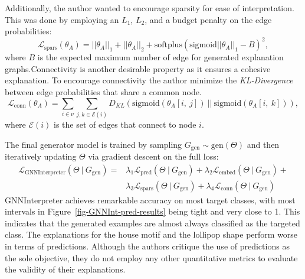 \documentclass[
  11pt,
  letterpaper,
]{article}
\begin{document}
Additionally, the author wanted to encourage sparsity for ease of
interpretation. This was done by employing an \(L_1\), \(L_2\), and a
budget penalty on the edge probabilities:\\
\begin{equation}
        \mathcal{L}_{\text{spars}}(\theta_A) = ||\theta_A||_1 + ||\theta_A||_2 + \text{softplus}(\text{sigmoid}||\theta_A||_1 - B)^2, 
    \end{equation} where \(B\) is the expected maximum number of edge
for generated explanation graphs.Connectivity is another desirable
property as it ensures a cohesive explanation. To encourage connectivity
the author minimize the \emph{KL-Divergence} between edge probabilities
that share a common node. \begin{equation}
        \mathcal{L}_{\text{conn}}(\theta_A) = \sum_{i \in \nu} \sum_{j, k \in \mathcal{E}(i)} D_{KL}(\text{sigmoid}(\theta_A[i, \ j]) \ || \ \text{sigmoid}(\theta_A[i, \ k])), 
    \end{equation} where \(\mathcal{E}(i)\) is the set of edges that
connect to node \(i\).

\quad The final generator model is trained by sampling
\(G_\text{gen} \sim \text{gen}(\Theta)\) and then iteratively updating
\(\Theta\) via gradient descent on the full loss: \begin{equation}
        \begin{split}
            \mathcal{L}_{\text{GNNInterpreter}}(\Theta \ | \ G_\text{gen}) = 
            &\lambda_1 \mathcal{L}_{\text{pred}}(\Theta \ | \ G_\text{gen}) + 
            \lambda_2 \mathcal{L}_{\text{embed}}(\Theta \ | \ G_\text{gen}) +  \\
            &\lambda_3 \mathcal{L}_{\text{spars}}(\Theta \ | \ G_\text{gen}) +
            \lambda_4 \mathcal{L}_{\text{conn}}(\Theta \ | \ G_\text{gen}) 
        \end{split}
    \end{equation} GNNInterpreter achieves remarkable accuracy on most
target classes, with most intervals in
Figure~\ref{fig-GNNInt-pred-results} being tight and very close to 1.
This indicates that the generated examples are almost always classified
as the targeted class. The explanations for the house motif and the
lollipop shape perform worse in terms of predictions. Although the
authors critique the use of predictions as the sole objective, they do
not employ any other quantitative metrics to evaluate the validity of
their explanations.
\end{document}
